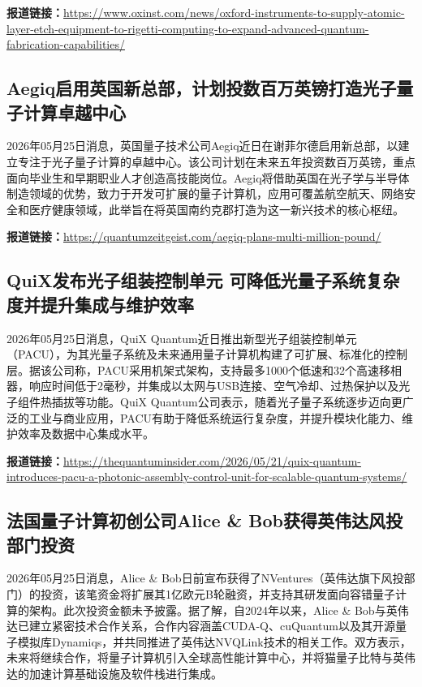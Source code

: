 \documentclass[12pt,a4paper]{ctexart}
\begin{document}
\noindent\textbf{报道链接：}\url{https://www.oxinst.com/news/oxford-instruments-to-supply-atomic-layer-etch-equipment-to-rigetti-computing-to-expand-advanced-quantum-fabrication-capabilities/}

\subsection{ Aegiq启用英国新总部，计划投数百万英镑打造光子量子计算卓越中心 }

2026年05月25日消息，英国量子技术公司Aegiq近日在谢菲尔德启用新总部，以建立专注于光子量子计算的卓越中心。该公司计划在未来五年投资数百万英镑，重点面向毕业生和早期职业人才创造高技能岗位。Aegiq将借助英国在光子学与半导体制造领域的优势，致力于开发可扩展的量子计算机，应用可覆盖航空航天、网络安全和医疗健康领域，此举旨在将英国南约克郡打造为这一新兴技术的核心枢纽。

\noindent\textbf{报道链接：}\url{https://quantumzeitgeist.com/aegiq-plans-multi-million-pound/}

\subsection{ QuiX发布光子组装控制单元 可降低光量子系统复杂度并提升集成与维护效率 }

2026年05月25日消息，QuiX Quantum近日推出新型光子组装控制单元（PACU），为其光量子系统及未来通用量子计算机构建了可扩展、标准化的控制层。据该公司称，PACU采用机架式架构，支持最多1000个低速和32个高速移相器，响应时间低于2毫秒，并集成以太网与USB连接、空气冷却、过热保护以及光子组件热插拔等功能。QuiX Quantum公司表示，随着光子量子系统逐步迈向更广泛的工业与商业应用，PACU有助于降低系统运行复杂度，并提升模块化能力、维护效率及数据中心集成水平。

\noindent\textbf{报道链接：}\url{https://thequantuminsider.com/2026/05/21/quix-quantum-introduces-pacu-a-photonic-assembly-control-unit-for-scalable-quantum-systems/}

\subsection{ 法国量子计算初创公司Alice \& Bob获得英伟达风投部门投资 }

2026年05月25日消息，Alice \& Bob日前宣布获得了NVentures（英伟达旗下风投部门）的投资，该笔资金将扩展其1亿欧元B轮融资，并支持其研发面向容错量子计算的架构。此次投资金额未予披露。据了解，自2024年以来，Alice \& Bob与英伟达已建立紧密技术合作关系，合作内容涵盖CUDA-Q、cuQuantum以及其开源量子模拟库Dynamiqs，并共同推进了英伟达NVQLink技术的相关工作。双方表示，未来将继续合作，将量子计算机引入全球高性能计算中心，并将猫量子比特与英伟达的加速计算基础设施及软件栈进行集成。
\end{document}
